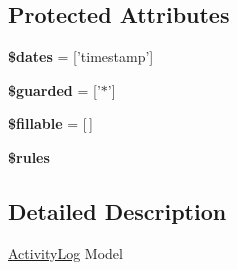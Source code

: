 \subsection*{Protected Attributes}
\begin{DoxyCompactItemize}
\item 
\hypertarget{classDMA_1_1Friends_1_1Models_1_1ActivityLog_a93009970cd65274bd1b7031986a53a52}{{\bfseries \$dates} = \mbox{[}'timestamp'\mbox{]}}\label{classDMA_1_1Friends_1_1Models_1_1ActivityLog_a93009970cd65274bd1b7031986a53a52}

\item 
\hypertarget{classDMA_1_1Friends_1_1Models_1_1ActivityLog_a1ee25a9d84f85dd39fbb9e5a5b005515}{{\bfseries \$guarded} = \mbox{[}'$\ast$'\mbox{]}}\label{classDMA_1_1Friends_1_1Models_1_1ActivityLog_a1ee25a9d84f85dd39fbb9e5a5b005515}

\item 
\hypertarget{classDMA_1_1Friends_1_1Models_1_1ActivityLog_ab42303e736f297bda15a97fd903b8d4d}{{\bfseries \$fillable} = \mbox{[}$\,$\mbox{]}}\label{classDMA_1_1Friends_1_1Models_1_1ActivityLog_ab42303e736f297bda15a97fd903b8d4d}

\item 
{\bfseries \$rules}
\end{DoxyCompactItemize}


\subsection{Detailed Description}
\hyperlink{classDMA_1_1Friends_1_1Models_1_1ActivityLog}{Activity\-Log} Model 

